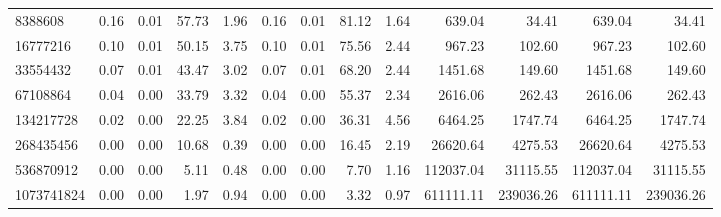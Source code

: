 \begin{tabular}{lrrrrrrrrrrrr}
8388608 & 0.16 & 0.01 & 57.73 & 1.96 & 0.16 & 0.01 & 81.12 & 1.64 & 639.04 & 34.41 & 639.04 & 34.41 \\
16777216 & 0.10 & 0.01 & 50.15 & 3.75 & 0.10 & 0.01 & 75.56 & 2.44 & 967.23 & 102.60 & 967.23 & 102.60 \\
33554432 & 0.07 & 0.01 & 43.47 & 3.02 & 0.07 & 0.01 & 68.20 & 2.44 & 1451.68 & 149.60 & 1451.68 & 149.60 \\
67108864 & 0.04 & 0.00 & 33.79 & 3.32 & 0.04 & 0.00 & 55.37 & 2.34 & 2616.06 & 262.43 & 2616.06 & 262.43 \\
134217728 & 0.02 & 0.00 & 22.25 & 3.84 & 0.02 & 0.00 & 36.31 & 4.56 & 6464.25 & 1747.74 & 6464.25 & 1747.74 \\
268435456 & 0.00 & 0.00 & 10.68 & 0.39 & 0.00 & 0.00 & 16.45 & 2.19 & 26620.64 & 4275.53 & 26620.64 & 4275.53 \\
536870912 & 0.00 & 0.00 & 5.11 & 0.48 & 0.00 & 0.00 & 7.70 & 1.16 & 112037.04 & 31115.55 & 112037.04 & 31115.55 \\
1073741824 & 0.00 & 0.00 & 1.97 & 0.94 & 0.00 & 0.00 & 3.32 & 0.97 & 611111.11 & 239036.26 & 611111.11 & 239036.26 \\
\bottomrule
\end{tabular}
